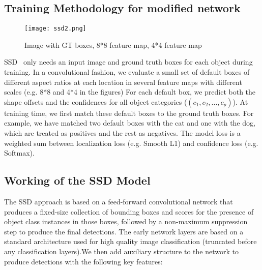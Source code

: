 	\subsection{Training Methodology for modified network}
		\begin{figure}[htbp]
			\centering
			\texttt{[image: ssd2.png]}
			\caption{Image with GT boxes, 8*8 feature map, 4*4 feature map\label{Image with GT boxes, 8*8 feature map, 4*4 feature map}}
		\end{figure}
		\newpage
		SSD~\cite{liu2016ssd} only needs an input image and ground truth boxes for each object during training. In a convolutional fashion, we evaluate a small set
		of default boxes of different aspect ratios at each location in several feature maps with different scales (e.g. 8*8 and 4*4 in the figures) For each default box, we predict both the shape offsets and the confidences for all object categories ($(c_1 , c_2 ,..., c_p)$).
		At training time, we first match these default boxes to the ground truth boxes. For example, we have matched two default boxes with the cat and one with the dog, which are treated as positives and the rest as negatives. The model loss is a weighted sum between localization loss (e.g. Smooth L1) and confidence loss (e.g. Softmax).
		
	\subsection{Working of the SSD Model}
		The SSD approach is based on a feed-forward convolutional network that produces a fixed-size collection of bounding boxes and scores for the presence of object class instances in those boxes, followed by a non-maximum suppression step to produce the final detections. The early network layers are based on a standard architecture used for high quality image classification (truncated before any classification layers).We then add auxiliary structure to the network to produce
		detections with the following key features:
		
